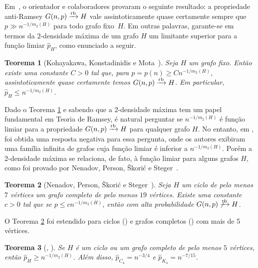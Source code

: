 \documentclass[11pt,twoside,a4paper]{book}
\def\rbarrow{\xrightarrow[]{\raisebox{0.0mm}[0mm]{$\scriptstyle \rm rb$}}}
\newtheorem{teorema}{Teorema}[section]
\theoremstyle{note}
\begin{document}
Em~\cite{KoKoMo12}, o orientador e colaboradores provaram o seguinte resultado: a propriedade anti-Ramsey $G(n,p)\rbarrow H$ vale assintoticamente quase certamente sempre que $p\gg n^{-1/m_2(H)}$ para todo grafo fixo~$H$. Em outras palavras, garante-se em termos da $2$-densidade máxima de um grafo $H$ um limitante superior para a função limiar $\hat{p}_H$, como enunciado a seguir.

\begin{teorema}[Kohayakawa, Konstadinidis e Mota~\cite{KoKoMo12}]
    \label{teo:conditional}
         Seja $H$ um grafo fixo. Então existe uma constante $C>0$ tal que, para $p=p(n)\geq Cn^{-1/m_2(H)}$, assintoticamente quase certamente temos ${G(n,p)\rbarrow H}$. 
         Em particular, $\hat{p}_H \leq n^{-1/m_2(H)}$.
  \end{teorema}
    
Dado o Teorema \ref{teo:conditional} e sabendo que a $2$-densidade máxima tem um papel fundamental em Teoria de Ramsey, é natural perguntar se $n^{-1/m_2(H)}$ é função limiar para a propriedade $G(n,p)\rbarrow H$ para qualquer grafo $H$.
No entanto, em \cite{KoKoMo16+}, foi obtida uma resposta negativa para essa pergunta, onde os autores exibiram uma família infinita de grafos cuja função limiar é inferior a $n^{-1/m_2(H)}$.
Porém a 2-densidade máxima se relaciona, de fato, à função limiar para alguns grafos $H$, como foi provado por Nenadov,
Person, Škorić e Steger~\cite{NePeSkSt14}.

\begin{teorema}[Nenadov, Person, Škorić e Steger~\cite{NePeSkSt14}]
\label{teo:nen}
  Seja $H$ um ciclo de pelo menos $7$ vértices um grafo completo de pelo menos $19$ vértices. 
  Existe uma constante $c > 0$ tal que se
  $p\leq cn^{-1/m_2(H)}$, 
  então com alta probabilidade $G(n,p)\not\rbarrow  H$.
\end{teorema}


O Teorema \ref{teo:nen} foi estendido para ciclos (\cite{barros2021anti}) e grafos completos (\cite{kohayakawa2019anti}) com mais de 5 vértices.

\begin{teorema}    
[\cite{barros2021anti},
\cite{kohayakawa2019anti}]
\label{teo:cyclecomplete} 
Se $H$ é um ciclo ou um grafo completo de pelo menos $5$ vértices, 
então $\hat{p}_{H} \geq n^{-1/m_2(H)}$. 
Além disso, $\hat{p}_{C_4} = n^{-3/4}$ 
e $\hat{p}_{K_4} = n^{-7/15}$.
\end{teorema}
    
\end{document}

